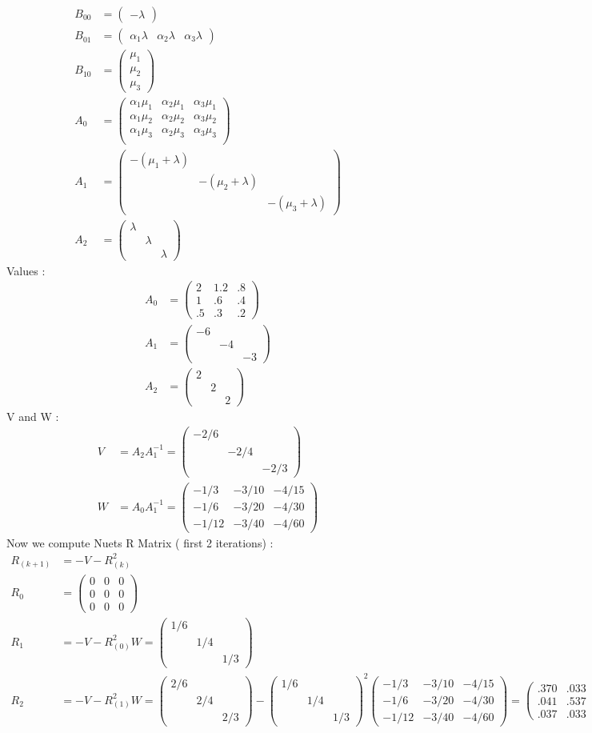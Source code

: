 \documentclass[fleqn]{article}
\newcommand{\mm}[1]{\begin{pmatrix}#1\end{pmatrix}}
\newcommand{\nn}[1]{ \begin{align*}#1\end{align*}}
\begin{document}
\nn{
	B_{00} 	&= \mm{-\lambda}\quad \\
  	B_{01} 	&= \mm{\alpha_1\lambda & \alpha_2\lambda &\alpha_3\lambda}\\
  	B_{10} 	&= \mm{\mu_1\\\mu_2\\\mu_3} \\
	A_{0} 	&= \mm{
		\alpha_1\mu_1&\alpha_2\mu_1&\alpha_3\mu_1\\
		\alpha_1\mu_2&\alpha_2\mu_2&\alpha_3\mu_2\\
		\alpha_1\mu_3&\alpha_2\mu_3&\alpha_3\mu_3\\
	} \\
	A_{1} 	&= \mm{
		-(\mu_1 + \lambda) \\
		&-(\mu_2+\lambda)\\
		&&-(\mu_3 +\lambda)} \\
	A_{2} 	&= \mm{
		\lambda\\
		&\lambda\\
		&&\lambda
	}
}
Values : 
\nn { 
	A_{0} &= \mm{2&1.2&.8\\1& .6&.4\\.5& .3&.2}\\ 
   	A_{1} &= \mm{-6\\&-4\\&&-3} \\
   	A_{2} &= \mm{2\\&2\\&&2}     
}
V and W :
\nn{
	V &= A_2A_1^{-1} =\mm{-2/6\\&-2/4\\&&-2/3} \\
	W &= A_0A_1^{-1} =\mm{-1/3&-3/10&-4/15\\-1/6&-3/20&-4/30\\-1/12&-3/40&-4/60}
}
Now we compute Nuets R Matrix ( first 2 iterations) :
\nn{
	R_{(k+1)} &= -V - R^2_{(k)}\\
	R_0 &=\mm{0&0&0\\0&0&0\\0&0&0}\\
	R_1 &= -V -R_{(0)}^{2}W =\boxed{\mm{1/6\\&1/4\\&&1/3}}\\
	R_2 &= -V -R^2_{(1)}W = \mm{2/6\\&2/4\\&&2/3} - \mm{1/6\\&1/4\\&&1/3}^2
    \mm{-1/3&-3/10&-4/15\\-1/6&-3/20&-4/30\\-1/12&-3/40&-4/60}
    =\boxed{\mm{
	    .370  &  .033 &   .029 \\
	    .041 &   .537 &   .033 \\
	    .037 &   .033 &   .696
	 }}}
  
\end{document}

